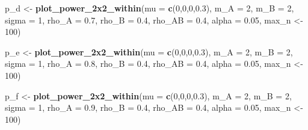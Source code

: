 \documentclass[]{article}
\newenvironment{Shaded}{\begin{snugshade}}{\end{snugshade}}
\newcommand{\KeywordTok}[1]{\textcolor[rgb]{0.13,0.29,0.53}{\textbf{#1}}}
\newcommand{\DataTypeTok}[1]{\textcolor[rgb]{0.13,0.29,0.53}{#1}}
\newcommand{\DecValTok}[1]{\textcolor[rgb]{0.00,0.00,0.81}{#1}}
\newcommand{\FloatTok}[1]{\textcolor[rgb]{0.00,0.00,0.81}{#1}}
\newcommand{\StringTok}[1]{\textcolor[rgb]{0.31,0.60,0.02}{#1}}
\newcommand{\NormalTok}[1]{#1}
\begin{document}
\begin{Shaded}
\begin{Highlighting}[]
\NormalTok{p_d <-}\StringTok{ }\KeywordTok{plot_power_2x2_within}\NormalTok{(}\DataTypeTok{mu =} \KeywordTok{c}\NormalTok{(}\DecValTok{0}\NormalTok{,}\DecValTok{0}\NormalTok{,}\DecValTok{0}\NormalTok{,}\FloatTok{0.3}\NormalTok{), }
                      \DataTypeTok{m_A =} \DecValTok{2}\NormalTok{, }
                      \DataTypeTok{m_B =} \DecValTok{2}\NormalTok{, }
                      \DataTypeTok{sigma =} \DecValTok{1}\NormalTok{, }
                      \DataTypeTok{rho_A =} \FloatTok{0.7}\NormalTok{, }
                      \DataTypeTok{rho_B =} \FloatTok{0.4}\NormalTok{, }
                      \DataTypeTok{rho_AB =} \FloatTok{0.4}\NormalTok{, }
                      \DataTypeTok{alpha =} \FloatTok{0.05}\NormalTok{,}
\NormalTok{                      max_n <-}\StringTok{ }\DecValTok{100}\NormalTok{)}

\NormalTok{p_e <-}\StringTok{ }\KeywordTok{plot_power_2x2_within}\NormalTok{(}\DataTypeTok{mu =} \KeywordTok{c}\NormalTok{(}\DecValTok{0}\NormalTok{,}\DecValTok{0}\NormalTok{,}\DecValTok{0}\NormalTok{,}\FloatTok{0.3}\NormalTok{), }
                      \DataTypeTok{m_A =} \DecValTok{2}\NormalTok{, }
                      \DataTypeTok{m_B =} \DecValTok{2}\NormalTok{, }
                      \DataTypeTok{sigma =} \DecValTok{1}\NormalTok{, }
                      \DataTypeTok{rho_A =} \FloatTok{0.8}\NormalTok{, }
                      \DataTypeTok{rho_B =} \FloatTok{0.4}\NormalTok{, }
                      \DataTypeTok{rho_AB =} \FloatTok{0.4}\NormalTok{, }
                      \DataTypeTok{alpha =} \FloatTok{0.05}\NormalTok{,}
\NormalTok{                      max_n <-}\StringTok{ }\DecValTok{100}\NormalTok{)}

\NormalTok{p_f <-}\StringTok{ }\KeywordTok{plot_power_2x2_within}\NormalTok{(}\DataTypeTok{mu =} \KeywordTok{c}\NormalTok{(}\DecValTok{0}\NormalTok{,}\DecValTok{0}\NormalTok{,}\DecValTok{0}\NormalTok{,}\FloatTok{0.3}\NormalTok{), }
                      \DataTypeTok{m_A =} \DecValTok{2}\NormalTok{, }
                      \DataTypeTok{m_B =} \DecValTok{2}\NormalTok{, }
                      \DataTypeTok{sigma =} \DecValTok{1}\NormalTok{, }
                      \DataTypeTok{rho_A =} \FloatTok{0.9}\NormalTok{, }
                      \DataTypeTok{rho_B =} \FloatTok{0.4}\NormalTok{, }
                      \DataTypeTok{rho_AB =} \FloatTok{0.4}\NormalTok{, }
                      \DataTypeTok{alpha =} \FloatTok{0.05}\NormalTok{,}
\NormalTok{                      max_n <-}\StringTok{ }\DecValTok{100}\NormalTok{)}


\end{Highlighting}
\end{Shaded}
\end{document}
